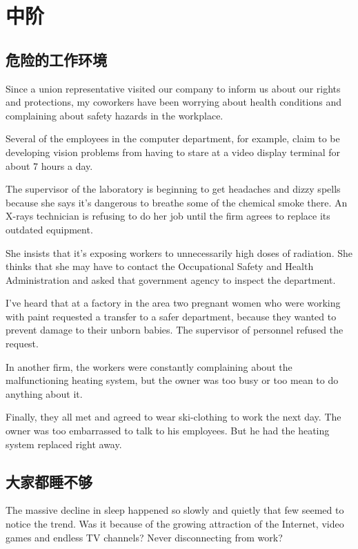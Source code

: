 \newpage
\section{中阶}
\setcounter{subsection}{18}
\subsection{危险的工作环境}
\begin{margintable}\vspace{-2cm}\footnotesize
\end{margintable}
Since a union representative visited our company to inform
us about our rights and protections, my coworkers
have been worrying about health conditions and complaining
about safety hazards in the workplace.

Several of the employees in the computer department,
for example, claim to be developing vision problems from
having to stare at a video display terminal for about 7
hours a day.

The supervisor of the laboratory is beginning to get headaches
and dizzy spells because she says it's dangerous to
breathe some of the chemical smoke there. An X-rays
technician is refusing to do her job until the firm agrees to
replace its outdated equipment.

She insists that it's exposing workers to unnecessarily high
doses of radiation. She thinks that she may have to contact
the Occupational Safety and Health Administration
and asked that government agency to inspect the department.

I've heard that at a factory in the area two pregnant
women who were working with paint requested a transfer
to a safer department, because they wanted to prevent
damage to their unborn babies. The supervisor of personnel
refused the request.

In another firm, the workers were constantly complaining
about the malfunctioning heating system, but the
owner was too busy or too mean to do anything about it.

Finally, they all met and agreed to wear ski-clothing to
work the next day. The owner was too embarrassed to talk
to his employees. But he had the heating system replaced
right away.
\subsection{大家都睡不够}
\begin{margintable}\vspace{-2cm}\footnotesize
\end{margintable}
The massive decline in sleep happened so slowly and quietly
that few seemed to notice the trend. Was it because
of the growing attraction of the Internet, video games and
endless TV channels? Never disconnecting from work?


